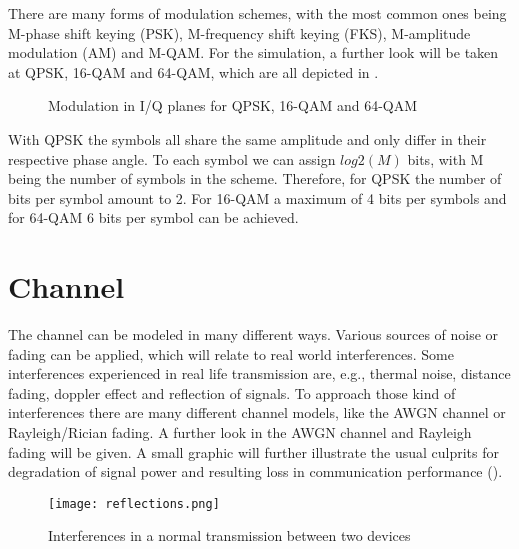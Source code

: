 There are many forms of modulation schemes, with the most common ones being M-phase shift keying (PSK), M-frequency shift keying (FKS), M-amplitude modulation (AM) and M-\gls{QAM}. For the simulation, a further look will be taken at \gls{QPSK}, 16-\gls{QAM} and 64-\gls{QAM}, which are all depicted in .

\begin{figure}[!htb]
	\setlength{}
	\setlength\fheight{0.3\textheight}
\begin{subfigure}
	
		
\end{subfigure}
\begin{subfigure}
	
	
\end{subfigure}
\begin{subfigure}

	
\end{subfigure}	
	\caption{Modulation in I/Q planes for QPSK, 16-QAM and 64-QAM}
	\label{fig:Modulation}
\end{figure}

With \gls{QPSK} the symbols all share the same amplitude and only differ in their respective phase angle. To each symbol we can assign $log2(M)$ bits, with M being the number of symbols in the scheme. Therefore, for \gls{QPSK} the number of bits per symbol amount to 2.
\newline
For 16-\gls{QAM} a maximum of 4 bits per symbols and for 64-\gls{QAM} 6 bits per symbol can be achieved. 

\clearpage

\section{Channel}
\label{sec:channel} 
The channel can be modeled in many different ways. Various sources of noise or fading can be applied, which will relate to real world interferences. Some interferences experienced in real life transmission are, e.g., thermal noise, distance fading, doppler effect and reflection of signals. To approach those kind of interferences there are many different channel models, like the \gls{AWGN} channel or Rayleigh/Rician fading. A further look in the \gls{AWGN} channel and Rayleigh fading will be given. A small graphic will further illustrate the usual culprits for degradation of signal power and resulting loss in communication performance ().
\begin{figure}[!htb]
	\centering
	\texttt{[image: reflections.png]}
	\caption{Interferences in a normal transmission between two devices}
	\label{fig:interferences}
\end{figure}
\newpage
